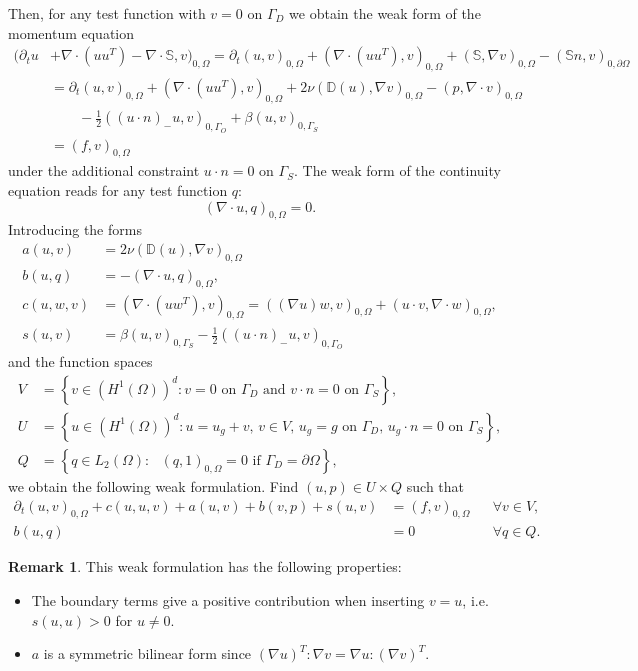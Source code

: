 \documentclass[a4paper,12pt]{article}
\theoremstyle{definition}
\newtheorem{Rem}[Def]{Remark}
\begin{document}
Then, for any test function with $v=0$ on $\Gamma_D$ we obtain the weak form of the momentum equation
\begin{equation*}
\begin{split}
(\partial_t u &+ \nabla\cdot(uu^T) - \nabla\cdot\mathbb{S},v)_{0,\Omega} = 
\partial_t( u,v )_{0,\Omega} + (\nabla\cdot(uu^T),v)_{0,\Omega} + (\mathbb{S},\nabla v)_{0,\Omega} - (\mathbb{S}n,v)_{0,\partial\Omega}\\
&= \partial_t( u,v )_{0,\Omega} + (\nabla\cdot(uu^T),v)_{0,\Omega} + 2\nu(\mathbb{D}(u),\nabla v)_{0,\Omega} - (p,\nabla\cdot v)_{0,\Omega}\\
& \qquad - \frac12 ( (u\cdot n)_- u , v)_{0,\Gamma_O} + \beta (u,v)_{0,\Gamma_S} \\
&= (f,v)_{0,\Omega} 
\end{split}
\end{equation*}
under the additional constraint $u\cdot n=0$ on $\Gamma_S$.
The weak form of the continuity equation reads for any test function $q$:
\begin{equation*}
(\nabla\cdot u , q)_{0,\Omega} = 0 .
\end{equation*}
Introducing the forms
\begin{align}
a(u,v) &= 2\nu(\mathbb{D}(u),\nabla v)_{0,\Omega} \\
b(u,q) &= -(\nabla\cdot u , q)_{0,\Omega},\\
c(u,w,v) &=  (\nabla\cdot(uw^T),v)_{0,\Omega} = ( (\nabla u)w , v )_{0,\Omega} + (u\cdot v, \nabla\cdot w)_{0,\Omega},\\
s(u,v) &=  \beta (u,v)_{0,\Gamma_S} - \frac12 ( (u\cdot n)_- u , v)_{0,\Gamma_O} 
\end{align}
and the function spaces
\begin{align}
V &= \left\{ v\in (H^1(\Omega))^d : \text{$v=0$ on $\Gamma_D$ and $v\cdot n=0$ on $\Gamma_S$} \right\},\\
U &= \left\{ u\in (H^1(\Omega))^d : \text{$u=u_g+v$, $v\in V$, $u_g=g$ on $\Gamma_D$, $u_g\cdot n=0$ on $\Gamma_S$} \right\},\\
Q &= \left\{ q\in L_2(\Omega) : \text{ $(q,1)_{0,\Omega}=0$ if $\Gamma_D=\partial\Omega$} \right\},
\end{align}
we obtain the following weak formulation. Find $(u,p)\in U\times Q$ such that
\begin{align}
\partial_t (u,v)_{0,\Omega} + c(u,u,v) + a(u,v) + b(v,p) + s(u,v)  &= (f,v)_{0,\Omega} &&\forall v\in V,\\
b(u,q) &= 0 &&\forall q\in Q.
\end{align}
\begin{Rem}
This weak formulation has the following properties:
\begin{itemize}
\item The boundary terms give a positive contribution when inserting $v=u$, i.e. $s(u,u) > 0$ for $u\neq 0$.
\item $a$ is a symmetric bilinear form since $(\nabla u)^T : \nabla v = \nabla u : (\nabla v)^T$.
\end{itemize}
\end{Rem}
\end{document}
